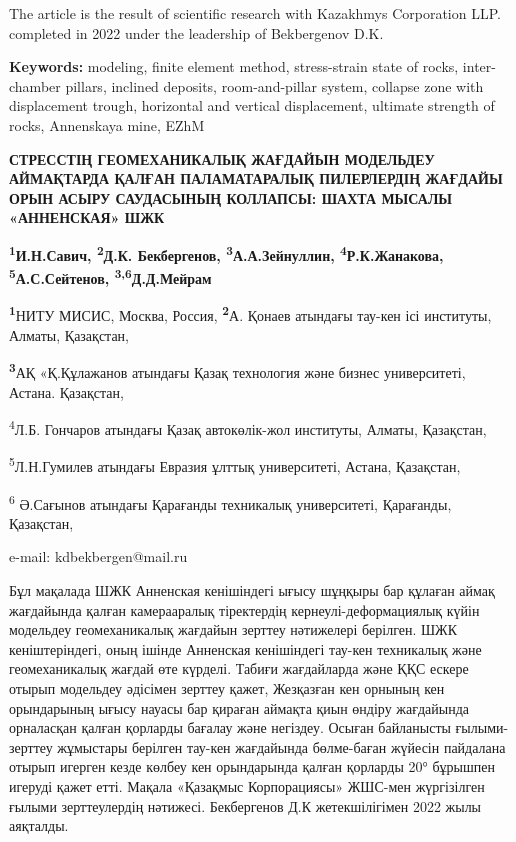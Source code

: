 The article is the result of scientific research with Kazakhmys
Corporation LLP. completed in 2022 under the leadership of Bekbergenov
D.K.

{\bfseries Keywords:} modeling, finite element method, stress-strain state
of rocks, inter-chamber pillars, inclined deposits, room-and-pillar
system, collapse zone with displacement trough, horizontal and vertical
displacement, ultimate strength of rocks, Annenskaya mine, EZhM

\begin{articleheader}

{\bfseries СТРЕССТІҢ ГЕОМЕХАНИКАЛЫҚ ЖАҒДАЙЫН МОДЕЛЬДЕУ АЙМАҚТАРДА ҚАЛҒАН ПАЛАМАТАРАЛЫҚ ПИЛЕРЛЕРДІҢ ЖАҒДАЙЫ ОРЫН АСЫРУ САУДАСЫНЫҢ КОЛЛАПСЫ: ШАХТА МЫСАЛЫ «АННЕНСКАЯ» ШЖК}

{\bfseries \textsuperscript{1}И.Н.Савич, \textsuperscript{2}Д.К.
Бекбергенов\textsuperscript{\envelope }, \textsuperscript{3}А.А.Зейнуллин,
\textsuperscript{4}Р.К.Жанакова, \textsuperscript{5}А.С.Сейтенов,
\textsuperscript{3,6}Д.Д.Мейрам}
\end{articleheader}
\begin{affiliation}

{\bfseries \textsuperscript{1}}НИТУ МИСИС, Москва, Россия,
{\bfseries \textsuperscript{2}}А. Қонаев атындағы тау-кен ісі институты,
Алматы, Қазақстан,

{\bfseries \textsuperscript{3}}АҚ «Қ.Құлажанов атындағы Қазақ технология
және бизнес университеті, Астана. Қазақстан,

\textsuperscript{4}Л.Б. Гончаров атындағы Қазақ автокөлік-жол институты,
Алматы, Қазақстан,

\textsuperscript{5}Л.Н.Гумилев атындағы Евразия ұлттық университеті,
Астана, Қазақстан,

\textsuperscript{6} Ә.Сағынов атындағы Қарағанды техникалық
университеті, Қарағанды, Қазақстан,

e-mail: kdbekbergen@mail.ru
\end{affiliation}

Бұл мақалада ШЖК Анненская кенішіндегі ығысу шұңқыры бар құлаған аймақ
жағдайында қалған камерааралық тіректердің кернеулі-деформациялық күйін
модельдеу геомеханикалық жағдайын зерттеу нәтижелері берілген. ШЖК
кеніштеріндегі, оның ішінде Анненская кенішіндегі тау-кен техникалық
және геомеханикалық жағдай өте күрделі. Табиғи жағдайларда және ҚҚС
ескере отырып модельдеу әдісімен зерттеу қажет, Жезқазған кен орнының
кен орындарының ығысу науасы бар қираған аймақта қиын өндіру жағдайында
орналасқан қалған қорларды бағалау және негіздеу. Осыған байланысты
ғылыми-зерттеу жұмыстары берілген тау-кен жағдайында бөлме-баған жүйесін
пайдалана отырып игерген кезде көлбеу кен орындарында қалған қорларды
20° бұрышпен игеруді қажет етті. Мақала «Қазақмыс Корпорациясы» ЖШС-мен
жүргізілген ғылыми зерттеулердің нәтижесі. Бекбергенов Д.К
жетекшілігімен 2022 жылы аяқталды.

